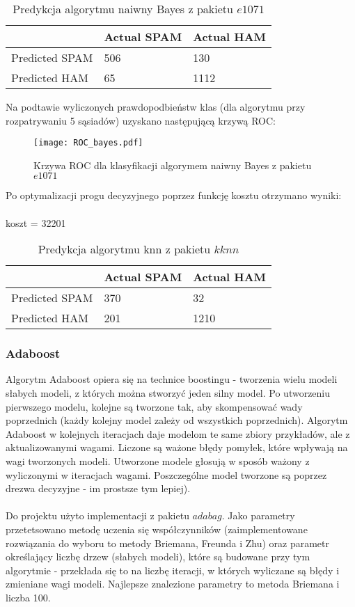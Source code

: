 \documentclass[fleqn]{article}
\begin{document}
\begin{table}[h!]
  \centering
  \label{tab:table1}
  \begin{tabular}{l||l|l}
     & Actual SPAM & Actual HAM\\
    \hline
    Predicted SPAM & 506 & 130\\
    Predicted HAM & 65 & 1112\\
  \end{tabular}
  \caption{Predykcja algorytmu naiwny Bayes z pakietu $e1071$}
\end{table}

\noindent Na podtawie wyliczonych prawdopodbieństw klas (dla algorytmu przy rozpatrywaniu 5 sąsiadów) uzyskano następującą krzywą ROC:

\begin{figure}[H]
\centering
\texttt{[image: ROC\_bayes.pdf]}
\caption{Krzywa ROC dla klasyfikacji algorymem naiwny Bayes z pakietu $e1071$ \label{overflow}}
\label{fig:picture}
\end{figure}

\noindent Po optymalizacji progu decyzyjnego poprzez funkcję kosztu otrzymano wyniki:
\\ \\
koszt = 32201

\begin{table}[h!]
  \centering
  \label{tab:table1}
  \begin{tabular}{l||l|l}
     & Actual SPAM & Actual HAM\\
    \hline
    Predicted SPAM & 370 & 32\\
    Predicted HAM & 201 & 1210\\
  \end{tabular}
  \caption{Predykcja algorytmu knn z pakietu $kknn$}
\end{table}

\subsubsection{Adaboost}
Algorytm Adaboost opiera się na technice boostingu - tworzenia wielu modeli słabych modeli, z których można stworzyć jeden silny model. Po utworzeniu pierwszego modelu, kolejne są tworzone tak, aby skompensować wady poprzednich (każdy kolejny model zależy od wszystkich poprzednich). Algorytm Adaboost w kolejnych iteracjach daje modelom te same zbiory przykładów, ale z aktualizowanymi wagami. Liczone są ważone błędy pomyłek, które wpływają na wagi tworzonych modeli. Utworzone modele głosują w sposób ważony z wyliczonymi w iteracjach wagami. Poszczególne model tworzone są poprzez drezwa decyzyjne - im prostsze tym lepiej).
\\ \\
Do projektu użyto implementacji z pakietu $adabag$. Jako parametry przetetsowano metodę uczenia się współczynników (zaimplementowane rozwiązania do wyboru to metody Briemana, Freunda i Zhu) oraz parametr określający liczbę drzew (słabych modeli), które są budowane przy tym algorytmie - przekłada się to na liczbę iteracji, w których wyliczane są błędy i zmieniane wagi modeli. Najlepsze znalezione parametry to metoda Briemana i liczba 100.
\end{document}
